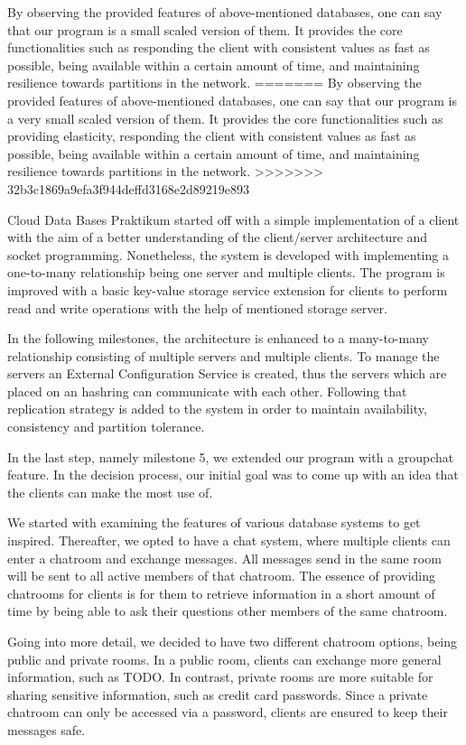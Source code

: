 By observing the provided features of above-mentioned databases, one can say that our program is a small scaled version of them. It provides the core functionalities such as responding the client with consistent values as fast as possible, being available within a certain amount of time, and maintaining resilience towards partitions in the network.
=======
By observing the provided features of above-mentioned databases, one can say that our program is a very small scaled version of them. It provides the core functionalities such as providing elasticity, responding the client with consistent values as fast as possible, being available within a certain amount of time, and maintaining resilience towards partitions in the network.
>>>>>>> 32b3c1869a9efa3f944deffd3168e2d89219e893

Cloud Data Bases Praktikum started off with a simple implementation of a client with the aim of a better understanding of the client/server architecture and socket programming. Nonetheless, the system is developed with implementing a one-to-many relationship being one server and multiple clients. The program is improved with a basic key-value storage service extension for clients to perform read and write operations with the help of mentioned storage server. 

In the following milestones, the architecture is enhanced to a many-to-many relationship consisting of multiple servers and multiple clients. To manage the servers an External Configuration Service is created, thus the servers which are placed on an hashring can communicate with each other. Following that replication strategy is added to the system in order to maintain availability, consistency and partition tolerance. 

In the last step, namely milestone 5, we extended our program with a groupchat feature. In the decision process, our initial goal was to come up with an idea that the clients can make the most use of.

We started with examining the features of various database systems to get inspired. Thereafter, we opted to have a chat system, where multiple clients can enter a chatroom and exchange messages. All messages send in the same room will be sent to all active members of that chatroom. The essence of providing chatrooms for clients is for them to retrieve information in a short amount of time by being able to ask their questions other members of the same chatroom. 

Going into more detail, we decided to have two different chatroom options, being public and private rooms. In a public room, clients can exchange more general information, such as TODO. In contrast, private rooms are more suitable for sharing sensitive information, such as credit card passwords. Since a private chatroom can only be accessed via a password, clients are ensured to keep their messages safe.

